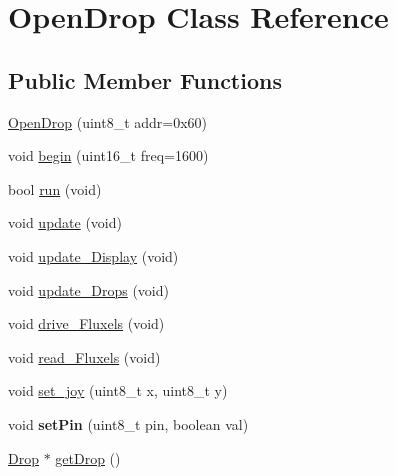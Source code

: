 \hypertarget{class_open_drop}{}\section{Open\+Drop Class Reference}
\label{class_open_drop}
\subsection*{Public Member Functions}
\begin{DoxyCompactItemize}
\item 
\mbox{\hyperlink{class_open_drop_a788cd7194b7248a39453ab99168639ec}{Open\+Drop}} (uint8\+\_\+t addr=0x60)
\item 
void \mbox{\hyperlink{class_open_drop_a22211279e88f493dc8fa56248cf74bd1}{begin}} (uint16\+\_\+t freq=1600)
\item 
bool \mbox{\hyperlink{class_open_drop_ab9249d33a60f3527cf43a243e84f9fde}{run}} (void)
\item 
void \mbox{\hyperlink{class_open_drop_a7861cb91ff543065b3cac3e5698eb1f4}{update}} (void)
\item 
void \mbox{\hyperlink{class_open_drop_a95a40fe5db3d7187c2932e301f295d12}{update\+\_\+\+Display}} (void)
\item 
void \mbox{\hyperlink{class_open_drop_ab92f14cd428512fc3572c9a08cb7952e}{update\+\_\+\+Drops}} (void)
\item 
void \mbox{\hyperlink{class_open_drop_a45775dc543679acd609ad58da6a79db0}{drive\+\_\+\+Fluxels}} (void)
\item 
void \mbox{\hyperlink{class_open_drop_a4b531b2101497f257cf80338ecf9536c}{read\+\_\+\+Fluxels}} (void)
\item 
void \mbox{\hyperlink{class_open_drop_a22b59d59e85c2e36fee67cd38c11ec69}{set\+\_\+joy}} (uint8\+\_\+t x, uint8\+\_\+t y)
\item 
\mbox{\label{class_open_drop_a298556045435c641e3307b8d41745f2e}} 
void {\bfseries set\+Pin} (uint8\+\_\+t pin, boolean val)
\item 
\mbox{\hyperlink{class_drop}{Drop}} $\ast$ \mbox{\hyperlink{class_open_drop_ac9894f9bc445bff9c94b6ad8de7aa70b}{get\+Drop}} ()
\end{DoxyCompactItemize}
